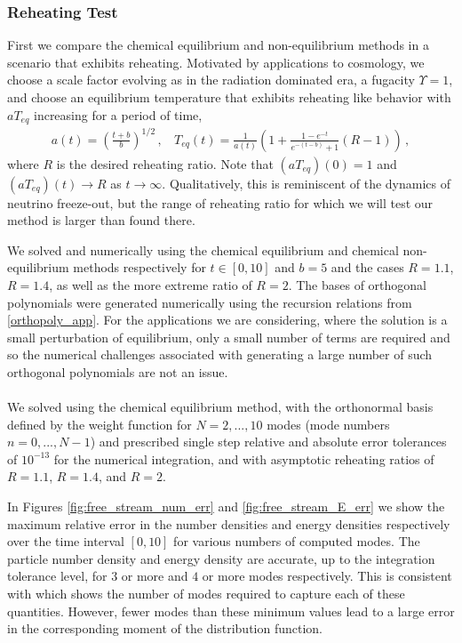\subsubsection{Reheating Test}
First we compare the chemical equilibrium and non-equilibrium methods in a scenario that exhibits reheating.  Motivated by applications to cosmology, we choose a scale factor evolving as in the radiation dominated era, a fugacity $\Upsilon=1$, and choose an equilibrium temperature that exhibits reheating like behavior with $aT_{eq}$ increasing for a period of time,
\begin{align}\label{a_T_def}
a(t)=\left(\frac{t+b}{b}\right)^{1/2}\,,\ \  \ \
T_{eq}(t)=\frac{1}{a(t)}\left(1+\frac{1-e^{-t}}{e^{-(t-b)}+1}(R-1)\right)\,,
\end{align}
where $R$ is the desired reheating ratio. Note that $(aT_{eq})(0)=1$ and $(aT_{eq})(t)\rightarrow R$ as $t\rightarrow\infty$. Qualitatively, this is reminiscent of the dynamics of neutrino freeze-out, but the range of reheating ratio for which we will test our method is larger than found there.

We solved  and  numerically using the chemical equilibrium and chemical non-equilibrium methods respectively for $t\in[0,10]$ and $b=5$ and the cases $R=1.1$, $R=1.4$, as well as the more extreme ratio of $R=2$.  The bases of orthogonal polynomials were generated numerically using the recursion relations from \ref{orthopoly_app}.  For the applications we are considering, where the solution is a small perturbation of equilibrium, only a small number of terms are required and so the numerical challenges associated with generating a large number of such orthogonal polynomials are not an issue.\\

\\
We solved  using the chemical equilibrium method, with the orthonormal basis defined by the weight function  for $N=2,...,10$ modes (mode numbers $n=0,...,N-1$) and prescribed  single step relative and absolute error tolerances of $10^{-13}$ for the numerical integration, and with asymptotic reheating ratios of $R=1.1$, $R=1.4$, and $R=2$.   



In Figures \ref{fig:free_stream_num_err} and  \ref{fig:free_stream_E_err} we show the maximum relative error in the number densities and energy densities respectively over the time interval $[0,10]$ for various numbers of computed modes.  The particle number density and energy density are accurate, up to the integration tolerance level, for $3$ or more and $4$ or more modes respectively. This is consistent with  which shows the number of modes required to capture each of these quantities. However, fewer modes than these minimum values lead to a large error in the corresponding moment of the distribution function.


